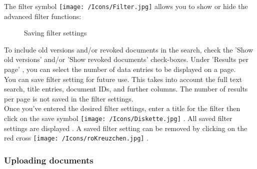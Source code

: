 The filter symbol \texttt{[image: /Icons/Filter.jpg]}  allows you to show or hide the advanced filter functions:

\begin{figure}[H]
\caption{Saving filter settings}
\end{figure}

To include old versions and/or revoked documents in the search, check the 'Show old versions'  and/or 'Show revoked documents'  check-boxes. Under 'Results per page' , you can select the number of data entries to be displayed on a page.\\
You can save filter setting for future use. This takes into account the full text search, title entries, document IDs, and further columns. The number of results per page is not saved in the filter settings.\\
Once you've entered the desired filter settings, enter a title for the filter  then click on the save symbol \texttt{[image: /Icons/Diskette.jpg]} . All saved filter settings are displayed . A saved filter setting can be removed by clicking on the red cross \texttt{[image: /Icons/roKreuzchen.jpg]} .


\subsubsection{Uploading documents}
\label{bkm:Ref442863508}\label{bkm:Ref442787515}\label{bkm:Ref442778397}\label{bkm:Ref442770648}\label{bkm:Ref442769978}

\begin{figure}[H]
\end{figure}

